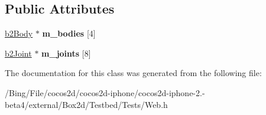 \subsection*{Public Attributes}
\begin{DoxyCompactItemize}
\item 
\hypertarget{class_web_af57295cc2297104ec936d9867d703053}{\hyperlink{classb2_body}{b2\-Body} $\ast$ {\bfseries m\-\_\-bodies} \mbox{[}4\mbox{]}}\label{class_web_af57295cc2297104ec936d9867d703053}

\item 
\hypertarget{class_web_a9f3460fd3c4565f0fc9d18cc50e1bb2f}{\hyperlink{classb2_joint}{b2\-Joint} $\ast$ {\bfseries m\-\_\-joints} \mbox{[}8\mbox{]}}\label{class_web_a9f3460fd3c4565f0fc9d18cc50e1bb2f}

\end{DoxyCompactItemize}


The documentation for this class was generated from the following file\-:\begin{DoxyCompactItemize}
\item 
/\-Bing/\-File/cocos2d/cocos2d-\/iphone/cocos2d-\/iphone-\/2.-\/beta4/external/\-Box2d/\-Testbed/\-Tests/Web.\-h\end{DoxyCompactItemize}
